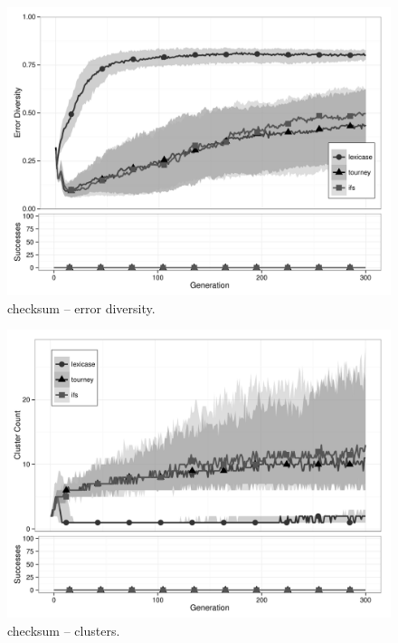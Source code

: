 \begin{figure}%
\centering
\includegraphics[width=11.5cm]{checksum-diversity.pdf}
\caption{checksum -- error diversity.}
\label{checksumDiv}
\end{figure}

\begin{figure}%
\centering
\includegraphics[width=11.5cm]{checksum-cluster.pdf}
\caption{checksum -- clusters.}
\label{checksumClu}
\end{figure}

